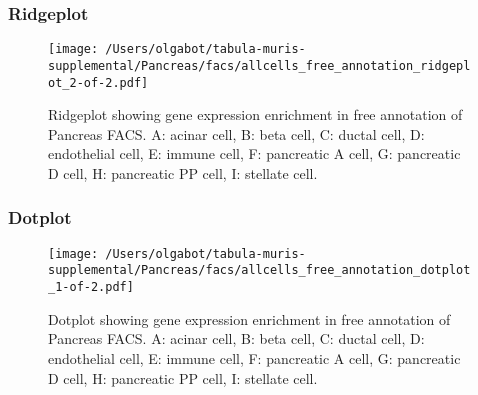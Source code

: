 \newpage
\newpage
\subsubsection{Ridgeplot}
\begin{figure}[h]
\centering
\texttt{[image: /Users/olgabot/tabula-muris-supplemental/Pancreas/facs/allcells\_free\_annotation\_ridgeplot\_2-of-2.pdf]}

\caption{ Ridgeplot  showing gene expression enrichment in free annotation of Pancreas FACS. A: acinar cell, B: beta cell, C: ductal cell, D: endothelial cell, E: immune cell, F: pancreatic A cell, G: pancreatic D cell, H: pancreatic PP cell, I: stellate cell.}
\end{figure}


\newpage
\newpage
\subsubsection{Dotplot}
\begin{figure}[h]
\centering
\texttt{[image: /Users/olgabot/tabula-muris-supplemental/Pancreas/facs/allcells\_free\_annotation\_dotplot\_1-of-2.pdf]}

\caption{ Dotplot  showing gene expression enrichment in free annotation of Pancreas FACS. A: acinar cell, B: beta cell, C: ductal cell, D: endothelial cell, E: immune cell, F: pancreatic A cell, G: pancreatic D cell, H: pancreatic PP cell, I: stellate cell.}
\end{figure}

